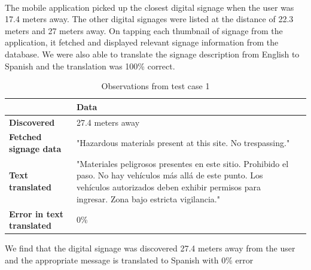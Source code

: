 \documentclass[12pt]{article}
\begin{document}
\paragraph{}The mobile application picked up the closest digital signage when the user was 17.4 meters away. The other digital signages were listed at the distance of 22.3 meters and 27 meters away. On tapping each thumbnail of signage from the application, it fetched and displayed relevant signage information from the database. We were also able to translate the signage description from English to Spanish and the translation was 100\% correct.

\begin{table}%
    \centering
  
    \label{my-label}
       \begin{tabular}{|p{30mm}|p{55mm}|p{35mm}|}
 \hline
  & \textbf{Data}  \\ [0.5ex] 
 \hline\hline
 \textbf{Discovered} & 27.4 meters away  \\ 
 \hline
 \textbf{Fetched signage data} & "Hazardous materials present at this site. No trespassing."  \\
 \hline
 \textbf{Text translated} &  "Materiales peligrosos presentes en este sitio. Prohibido el paso. No hay vehículos más allá de este punto. Los vehículos autorizados deben exhibir permisos para ingresar. Zona bajo estricta vigilancia." \\
 \hline
 \textbf{Error in text translated} & 0\%   \\ [1ex] 
 \hline
    \end{tabular}
      \caption{Observations from test case 1}{We find that the digital signage was discovered 27.4 meters away from the user and the appropriate message is translated to Spanish with 0\% error} 
\end{table}
\end{document}
